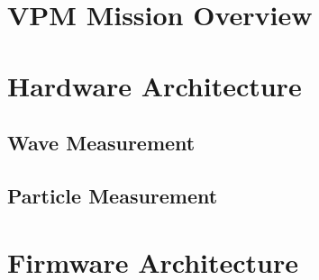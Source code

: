 \section{VPM Mission Overview}
\section{Hardware Architecture}
\subsection{Wave Measurement}
\subsection{Particle Measurement}
\section{Firmware Architecture}


